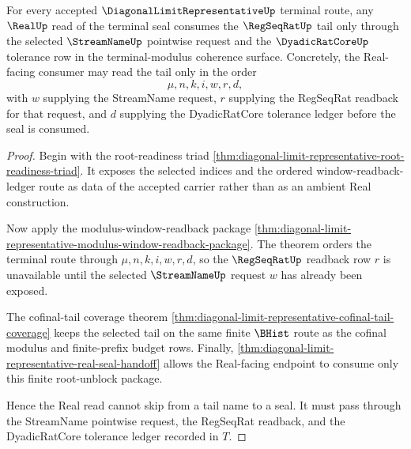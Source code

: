 \begin{theorem}
\label{thm:diagonal-limit-representative-real-regseq-streamname-tail-factorization}
For every accepted $\DiagonalLimitRepresentativeUp$ terminal route, any $\RealUp$ read of the terminal seal consumes the $\RegSeqRatUp$ tail only through the selected $\StreamNameUp$ pointwise request and the $\DyadicRatCoreUp$ tolerance row in the terminal-modulus coherence surface. Concretely, the Real-facing consumer may read the tail only in the order
$$
\mu,n,k,i,w,r,d,
$$
with $w$ supplying the StreamName request, $r$ supplying the RegSeqRat readback for that request, and $d$ supplying the DyadicRatCore tolerance ledger before the seal is consumed.
\end{theorem}
\begin{proof}
Begin with the root-readiness triad \autoref{thm:diagonal-limit-representative-root-readiness-triad}. It exposes the selected indices and the ordered window-readback-ledger route as data of the accepted carrier rather than as an ambient Real construction.

Now apply the modulus-window-readback package \autoref{thm:diagonal-limit-representative-modulus-window-readback-package}. The theorem orders the terminal route through $\mu,n,k,i,w,r,d$, so the $\RegSeqRatUp$ readback row $r$ is unavailable until the selected $\StreamNameUp$ request $w$ has already been exposed.

The cofinal-tail coverage theorem \autoref{thm:diagonal-limit-representative-cofinal-tail-coverage} keeps the selected tail on the same finite $\BHist$ route as the cofinal modulus and finite-prefix budget rows. Finally, \autoref{thm:diagonal-limit-representative-real-seal-handoff} allows the Real-facing endpoint to consume only this finite root-unblock package.

Hence the Real read cannot skip from a tail name to a seal. It must pass through the StreamName pointwise request, the RegSeqRat readback, and the DyadicRatCore tolerance ledger recorded in $T$.
\end{proof}

